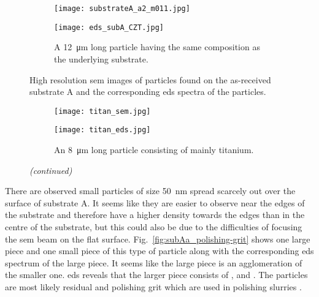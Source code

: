 \begin{figure}
\begin{subfigure}[t]{\textwidth}
\begin{minipage}[t]{0.49\linewidth}
            \centering
            \texttt{[image: substrateA\_a2\_m011.jpg]}
          \end{minipage}
          \hspace{0.02\linewidth}
          \begin{minipage}[t]{0.49\linewidth}
            \centering
            \texttt{[image: eds\_subA\_CZT.jpg]}
          \end{minipage}
        \caption{A \SI{12}{\micro\metre} long particle having the same composition as the underlying substrate.}\label{fig:subAa_czt-particle}
    \end{subfigure}
    \caption[\Ac{sem} images and \ac{eds} spectra of particles found on as-received substrate A.]{High resolution \acf{sem} images of particles found on the as-received substrate A and the corresponding \acf{eds} spectra of the particles.}\label{fig:subAa_sem_w_eds}
\end{figure}

\begin{figure}[htbp]
\ContinuedFloat
    \centering
    \begin{subfigure}[t]{\textwidth}
          \begin{minipage}[t]{0.49\linewidth}
            \centering
            \texttt{[image: titan\_sem.jpg]}
          \end{minipage}
          \hspace{0.02\linewidth}
          \begin{minipage}[t]{0.49\linewidth}
            \centering
            \texttt{[image: titan\_eds.jpg]}
          \end{minipage}
        \caption{An \SI{8}{\micro\metre} long particle consisting of mainly titanium.}\label{fig:subAa_titanium-particle}
    \end{subfigure}
    \captionsetup{list=no}
    \caption{\emph{(continued)}}
\end{figure}

There are observed small particles of size \SI{50}{\nano\metre} spread scarcely out over the surface of substrate A. It seems like they are easier to observe near the edges of the substrate and therefore have a higher density towards the edges than in the centre of the substrate, but this could also be due to the difficulties of focusing the \ac{sem} beam on the flat surface. Fig.~\ref{fig:subAa_polishing-grit} shows one large piece and one small piece of this type of particle along with the corresponding \ac{eds} spectrum of the large piece. It seems like the large piece is an agglomeration of the smaller one. \ac{eds} reveals that the larger piece consists of ,  and . The particles are most likely residual  and  polishing grit which are used in polishing slurries \citep{benson2015as-received}.

